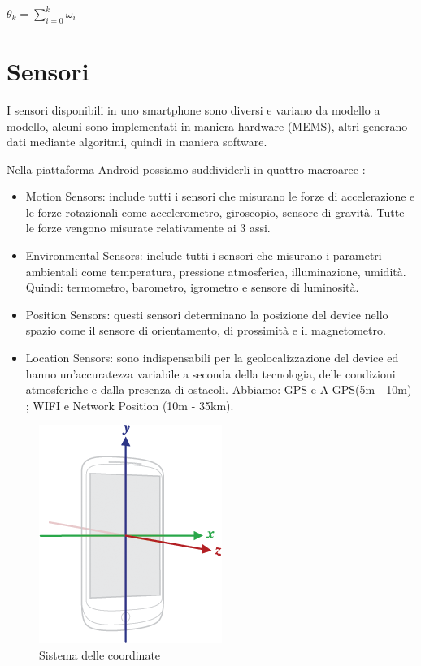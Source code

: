 \documentclass[12pt,a4paper,openright,twoside]{report}
\begin{document}
\begin{center}
$\theta_k = \sum_{i=0}^k \omega_i$
\end{center}

\section{Sensori}

I sensori disponibili in uno smartphone sono diversi e variano da modello a modello, alcuni sono implementati in maniera hardware (MEMS), altri generano dati mediante algoritmi, quindi in maniera software. 

Nella piattaforma Android possiamo suddividerli in quattro macroaree \cite{K9}:
\begin{itemize}
\item Motion Sensors: include tutti i sensori che misurano le forze di accelerazione e le forze rotazionali come accelerometro, giroscopio, sensore di gravità. Tutte le forze vengono misurate relativamente ai 3 assi.
\item Environmental Sensors: include tutti i sensori che misurano i parametri ambientali come temperatura, pressione atmosferica, illuminazione, umidità. Quindi: termometro, barometro, igrometro e sensore di luminosità.
\item Position Sensors: questi sensori determinano la posizione del device nello spazio come il sensore di orientamento, di prossimità e il magnetometro.
\item Location Sensors: sono indispensabili per la geolocalizzazione del device ed hanno un'accuratezza variabile a seconda della tecnologia, delle condizioni atmosferiche e dalla presenza di ostacoli. Abbiamo: GPS e A-GPS(5m - 10m) \cite{K10}; WIFI e Network Position (10m - 35km).
\end{itemize}

\begin{figure}[h] 
\centering 
\includegraphics[scale=0.8]{fig2} 
\caption{Sistema delle coordinate} 
\end{figure}
\end{document}
